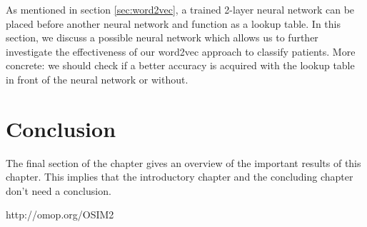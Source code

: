 As mentioned in section \ref{sec:word2vec}, a trained 2-layer neural network can be placed before another neural network and function as a lookup table. In this section, we discuss a possible neural network which allows us to further investigate the effectiveness of our word2vec approach to classify patients. More concrete: we should check if a better accuracy is acquired with the lookup table in front of the neural network or without. 



\section{Conclusion}
The final section of the chapter gives an overview of the important results
of this chapter. This implies that the introductory chapter and the
concluding chapter don't need a conclusion.


http://omop.org/OSIM2


